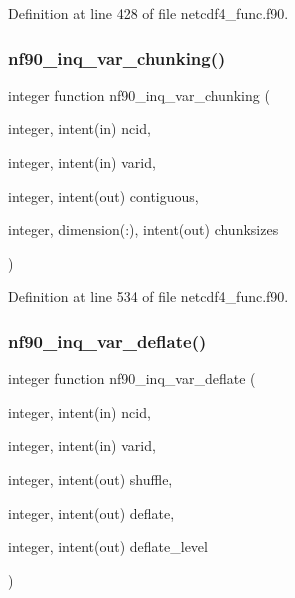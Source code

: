 Definition at line 428 of file netcdf4\+\_\+func.\+f90.

\mbox{\label{netcdf4__func_8f90_a83b3deacd43f6cf63e4d0dd0a566bbdf}} 
\subsubsection{\texorpdfstring{nf90\+\_\+inq\+\_\+var\+\_\+chunking()}{nf90\_inq\_var\_chunking()}}
{\footnotesize\ttfamily integer function nf90\+\_\+inq\+\_\+var\+\_\+chunking (\begin{DoxyParamCaption}\item[{integer, intent(in)}]{ncid,  }\item[{integer, intent(in)}]{varid,  }\item[{integer, intent(out)}]{contiguous,  }\item[{integer, dimension(\+:), intent(out)}]{chunksizes }\end{DoxyParamCaption})}



Definition at line 534 of file netcdf4\+\_\+func.\+f90.

\mbox{\label{netcdf4__func_8f90_ad075e2c7b73fecd709833342ccf4d695}} 
\subsubsection{\texorpdfstring{nf90\+\_\+inq\+\_\+var\+\_\+deflate()}{nf90\_inq\_var\_deflate()}}
{\footnotesize\ttfamily integer function nf90\+\_\+inq\+\_\+var\+\_\+deflate (\begin{DoxyParamCaption}\item[{integer, intent(in)}]{ncid,  }\item[{integer, intent(in)}]{varid,  }\item[{integer, intent(out)}]{shuffle,  }\item[{integer, intent(out)}]{deflate,  }\item[{integer, intent(out)}]{deflate\+\_\+level }\end{DoxyParamCaption})}



